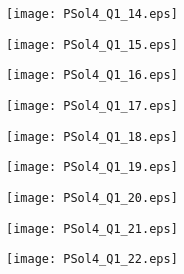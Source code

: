 \documentclass[10pt,letterpaper]{article}
\newcommand{\wid}{40mm}
\begin{document}
{\begin{figure}[htb]
\begin{subfigure}{0.24\textwidth}
\texttt{[image: PSol4\_Q1\_14.eps]}
\end{subfigure}
%
\begin{subfigure}{0.24\textwidth}
\texttt{[image: PSol4\_Q1\_15.eps]}
\end{subfigure}
%
\begin{subfigure}{0.24\textwidth}
\texttt{[image: PSol4\_Q1\_16.eps]}
\end{subfigure}
%
\begin{subfigure}{0.24\textwidth}
\texttt{[image: PSol4\_Q1\_17.eps]}
\end{subfigure}
%
\begin{subfigure}{0.24\textwidth}
\texttt{[image: PSol4\_Q1\_18.eps]}
\end{subfigure}
%
\begin{subfigure}{0.24\textwidth}
\texttt{[image: PSol4\_Q1\_19.eps]}
\end{subfigure}
%
\begin{subfigure}{0.24\textwidth}
\texttt{[image: PSol4\_Q1\_20.eps]}
\end{subfigure}
%
\begin{subfigure}{0.24\textwidth}
\texttt{[image: PSol4\_Q1\_21.eps]}
\end{subfigure}
%
\begin{subfigure}{0.24\textwidth}
\texttt{[image: PSol4\_Q1\_22.eps]}
\end{subfigure}
%
\end{figure}
}
\end{document}
